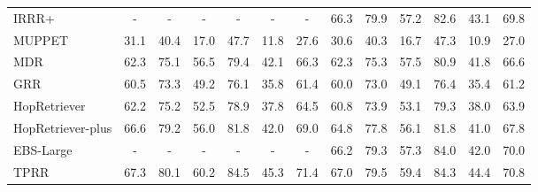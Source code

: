 \documentclass[11pt]{article}
\begin{document}
\begin{table*}
{\begin{tabular}{lcccccccccccc}
IRRR+ \citep{qi2020retrieve}                  & -             & -             & -             & -             & -             & -             & 66.3                                     & 79.9          & 57.2                   & 82.6          & 43.1                   & 69.8                    \\
MUPPET \citep{feldman-el-yaniv-2019-multi}                 & 31.1          & 40.4          & 17.0          & 47.7          & 11.8          & 27.6          & 30.6                                     & 40.3          & 16.7                   & 47.3          & 10.9                   & 27.0                    \\
MDR \citep{xiong2021answering}                    & 62.3          & 75.1          & 56.5          & 79.4          & 42.1          & 66.3          &  62.3 & 75.3          & 57.5                   & 80.9          & 41.8                   & 66.6                    \\
GRR \citep{Asai2020Learning}                    & 60.5          & 73.3          & 49.2          & 76.1          & 35.8          & 61.4          & 60.0                                     & 73.0          & 49.1                   & 76.4          & 35.4                   & 61.2                    \\
HopRetriever \citep{li2020hopretriever}           & 62.2          & 75.2          & 52.5          & 78.9          & 37.8          & 64.5          & 60.8                                     & 73.9          & 53.1                   & 79.3          & 38.0                   & 63.9                    \\
HopRetriever-plus \citep{li2020hopretriever}      & 66.6          & 79.2          & 56.0          & 81.8          & 42.0          & 69.0          & 64.8                                     & 77.8          & 56.1                   & 81.8          & 41.0                   & 67.8                    \\
EBS-Large       & -             & -             & -             & -             & -             & -             & 66.2                                     & 79.3          & 57.3                   & 84.0          & 42.0                   & 70.0                    \\
TPRR \citep{TPRR}          & 67.3          & 80.1          & 60.2          & 84.5          & 45.3          & 71.4          & 67.0                                     & 79.5          & 59.4                   & 84.3          & 44.4                   & 70.8                    \\ 

\end{tabular}}
\end{table*}
\end{document}
